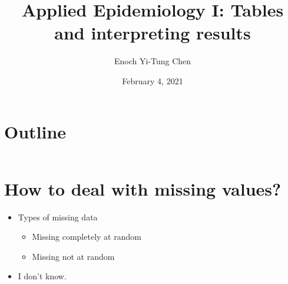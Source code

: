 

\title[Applied Epi I: Tables and interpreting results]{Applied Epidemiology I: Tables and interpreting results}
\date{February 4, 2021}
\author[Enoch Yi-Tung Chen]{Enoch Yi-Tung Chen}




\begin{frame}
\maketitle 
\end{frame}



\section*{Outline}
\begin{frame}{\secname}
 \begin{columns}[t]
        \begin{column}{.5\textwidth}
            \tableofcontents[sections={1-4}]
        \end{column}
        \begin{column}{.5\textwidth}
            \tableofcontents[sections={5-7}]
        \end{column}
\end{columns}
\end{frame}
\section{How to deal with missing values?}
\begin{frame}{\secname}
\begin{itemize}
\item Types of missing data \cite{Sterne2009}
\begin{itemize}
	\item Missing completely at random
	\item Missing not at random
\end{itemize}
	\item<2|handout:2-> I don't know.
\end{itemize}
\end{frame}

